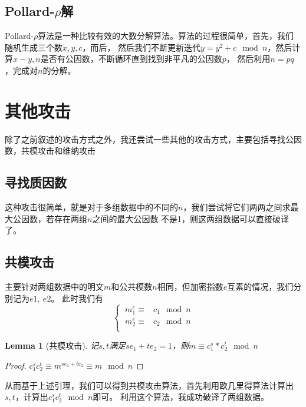 \documentclass{ctexart}
\newtheorem{lemma}[theorem]{Lemma}
\begin{document}
\subsection{Pollard-\texorpdfstring{$\rho$}分解}
Pollard-$\rho$算法是一种比较有效的大数分解算法。算法的过程很简单，首先，我们随机生成三个数$x,y,c$，而后，
然后我们不断更新迭代$y=y^2+c\mod n$，然后计算$x-y,n$是否有公因数，不断循环直到找到非平凡的公因数$p$，
然后利用$n=pq$，完成对$n$的分解。


\section{其他攻击}
除了之前叙述的攻击方式之外，我还尝试一些其他的攻击方式，主要包括寻找公因数，共模攻击和维纳攻击
\subsection{寻找质因数}
这种攻击很简单，就是对于多组数据中的不同的$n$，我们尝试将它们两两之间求最大公因数，若存在两组$n$之间的最大公因数
不是1，则这两组数据可以直接破译了。
\subsection{共模攻击}
主要针对两组数据中的明文$m$和公共模数$n$相同，但加密指数$e$互素的情况，我们分别记为$e1,\ e2$。
此时我们有
\begin{equation*}
    \begin{cases}
    \ m^e_1\equiv& c_1 \mod n\\
    \ m^e_2\equiv& c_2  \mod n \\
    \end{cases} 
\end{equation*}
\begin{lemma}[共模攻击]
    记$s,t$满足$se_1+te_2=1$，则$m\equiv c_1^s*c_2^t\mod n$
\end{lemma}
\begin{proof}
    $c_1^sc_2^t\equiv m^{se_1+te_2}\equiv m \mod n$
\end{proof}
从而基于上述引理，我们可以得到共模攻击算法，首先利用欧几里得算法计算出$s,t$，计算出$c_1^sc_2^t\mod n$即可。
利用这个算法，我成功破译了两组数据。
\end{document}

